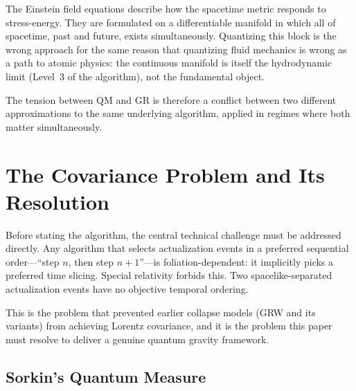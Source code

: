 \documentclass[11pt,a4paper]{article}
\theoremstyle{plain}
\theoremstyle{definition}
\theoremstyle{remark}
\begin{document}
The Einstein field equations describe how the spacetime metric responds to
stress-energy. They are formulated on a differentiable manifold in which all of
spacetime, past and future, exists simultaneously. Quantizing this block is the
wrong approach for the same reason that quantizing fluid mechanics is wrong as
a path to atomic physics: the continuous manifold is itself the hydrodynamic
limit (Level~3 of the algorithm), not the fundamental object.

The tension between QM and GR is therefore a conflict between two different
approximations to the same underlying algorithm, applied in regimes where both
matter simultaneously.

\section{The Covariance Problem and Its Resolution}
\label{sec:covariance}

Before stating the algorithm, the central technical challenge must be addressed
directly. Any algorithm that selects actualization events in a preferred sequential
order---``step $n$, then step $n+1$''---is foliation-dependent: it implicitly
picks a preferred time slicing. Special relativity forbids this. Two
spacelike-separated actualization events have no objective temporal ordering.

This is the problem that prevented earlier collapse models (GRW and its
variants) from achieving Lorentz covariance, and it is the problem this paper
must resolve to deliver a genuine quantum gravity framework.

\subsection{Sorkin's Quantum Measure}
\end{document}

